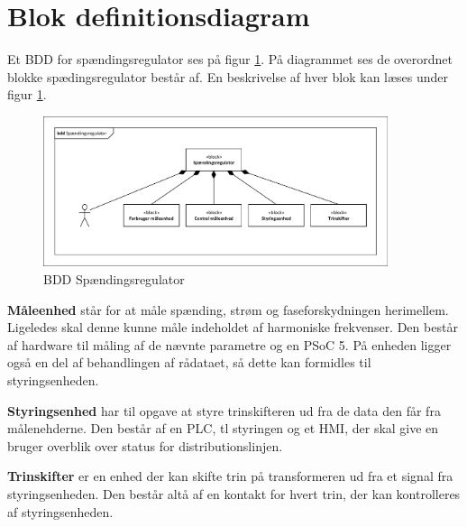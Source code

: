 
\section{Blok definitionsdiagram}
Et BDD for spændingsregulator ses på figur \ref{fig:BDDSpaendingsregulator}. På diagrammet ses de overordnet blokke spædingsregulator består af. En beskrivelse af hver blok kan læses under figur \ref{fig:BDDSpaendingsregulator}.

\begin{figure}[htbp] %
	\centering
	\includegraphics[width=0.9\textwidth]{Figure/BDDSpaendingsregulator}
	\caption{BDD Spændingsregulator}
	\label{fig:BDDSpaendingsregulator}
\end{figure}

\textbf{Måleenhed} står for at måle spænding, strøm og faseforskydningen herimellem. Ligeledes skal denne kunne måle indeholdet af harmoniske frekvenser. Den består af hardware til måling af de nævnte parametre og en PSoC 5. På enheden ligger også en del af behandlingen af rådataet, så dette kan formidles til styringsenheden.

\textbf{Styringsenhed} har til opgave at styre trinskifteren ud fra de data den får fra målenehderne. Den består af en PLC, tl styringen og et HMI, der skal give en bruger overblik over status for distributionslinjen.

\textbf{Trinskifter} er en enhed der kan skifte trin på transformeren ud fra et signal fra styringsenheden. Den består altå af en kontakt for hvert trin, der kan kontrolleres af styringsenheden.